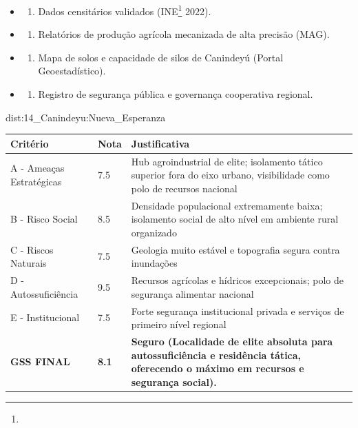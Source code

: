 {\begin{itemize}
\tightlist
\item
  \begin{enumerate}
  \def\labelenumi{\arabic{enumi})}
  \tightlist
  \item
    Dados censitários validados (INE\footnote{\fineINE} 2022).
  \end{enumerate}
\item
  \begin{enumerate}
  \def\labelenumi{\arabic{enumi})}
  \setcounter{enumi}{1}
  \tightlist
  \item
    Relatórios de produção agrícola mecanizada de alta precisão (MAG).
  \end{enumerate}
\item
  \begin{enumerate}
  \def\labelenumi{\arabic{enumi})}
  \setcounter{enumi}{2}
  \tightlist
  \item
    Mapa de solos e capacidade de silos de Canindeyú (Portal
    Geoestadístico).
  \end{enumerate}
\item
  \begin{enumerate}
  \def\labelenumi{\arabic{enumi})}
  \setcounter{enumi}{3}
  \tightlist
  \item
    Registro de segurança pública e governança cooperativa regional.
  \end{enumerate}
\end{itemize}}{dist:14_Canindeyu:Nueva_Esperanza}
\begin{table}[ht!]
\small \begin{tabular}{p{3.0cm}p{0.8cm}p{6.0cm}} \toprule
\textbf{Critério} & \textbf{Nota} & \textbf{Justificativa} \\ \midrule
A - Ameaças Estratégicas & 7.5 & Hub agroindustrial de elite; isolamento tático superior fora do eixo urbano, visibilidade como polo de recursos nacional \\
B - Risco Social & 8.5 & Densidade populacional extremamente baixa; isolamento social de alto nível em ambiente rural organizado \\
C - Riscos Naturais & 7.5 & Geologia muito estável e topografia segura contra inundações \\
D - Autossuficiência & 9.5 & Recursos agrícolas e hídricos excepcionais; polo de segurança alimentar nacional \\
E - Institucional & 7.5 & Forte segurança institucional privada e serviços de primeiro nível regional \\
\midrule \textbf{GSS FINAL} & \textbf{8.1} & \textbf{Seguro (Localidade de elite absoluta para autossuficiência e residência tática, oferecendo o máximo em recursos e segurança social).} \\ \bottomrule \end{tabular}
\end{table}
